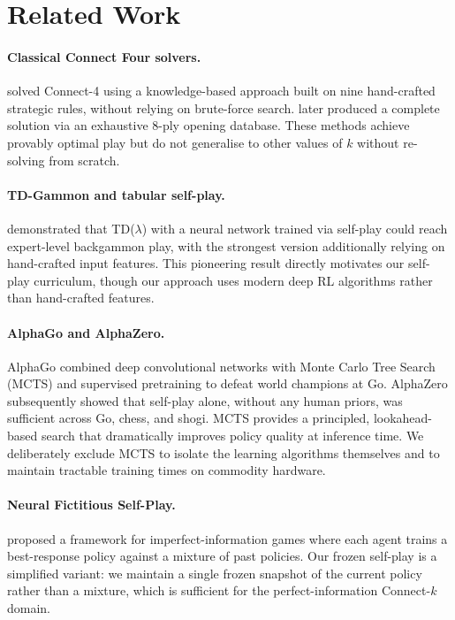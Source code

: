 \documentclass[10pt, letterpaper, twocolumn]{article}
\begin{document}
\section{Related Work}
\label{sec:related}

\paragraph{Classical Connect Four solvers.}
\citet{allis1994connect4} solved Connect-4 using a knowledge-based
approach built on nine hand-crafted strategic rules, without relying on
brute-force search.  \citet{tromp1995connectfour} later produced a
complete solution via an exhaustive 8-ply opening database.  These
methods achieve provably optimal play but do not generalise to other
values of $k$ without re-solving from scratch.

\paragraph{TD-Gammon and tabular self-play.}
\citet{tesauro1995tdgammon} demonstrated that TD($\lambda$) with a
neural network trained via self-play could reach expert-level backgammon
play, with the strongest version additionally relying on hand-crafted
input features.  This pioneering result directly motivates our self-play curriculum,
though our approach uses modern deep RL algorithms rather than
hand-crafted features.

\paragraph{AlphaGo and AlphaZero.}
AlphaGo \citep{silver2016alphago} combined deep convolutional networks
with Monte Carlo Tree Search (MCTS) and supervised pretraining to defeat
world champions at Go.  AlphaZero \citep{silver2018alphazero}
subsequently showed that self-play alone, without any human priors, was
sufficient across Go, chess, and shogi.  MCTS provides a principled, lookahead-based
search that dramatically improves policy quality at inference time.  We
deliberately exclude MCTS to isolate the learning algorithms themselves
and to maintain tractable training times on commodity hardware.

\paragraph{Neural Fictitious Self-Play.}
\citet{heinrich2016neuralFSP} proposed a framework for imperfect-information
games where each agent trains a best-response policy against a mixture of
past policies.  Our frozen self-play is a simplified variant: we maintain
a single frozen snapshot of the current policy rather than a mixture,
which is sufficient for the perfect-information Connect-$k$ domain.
\end{document}

